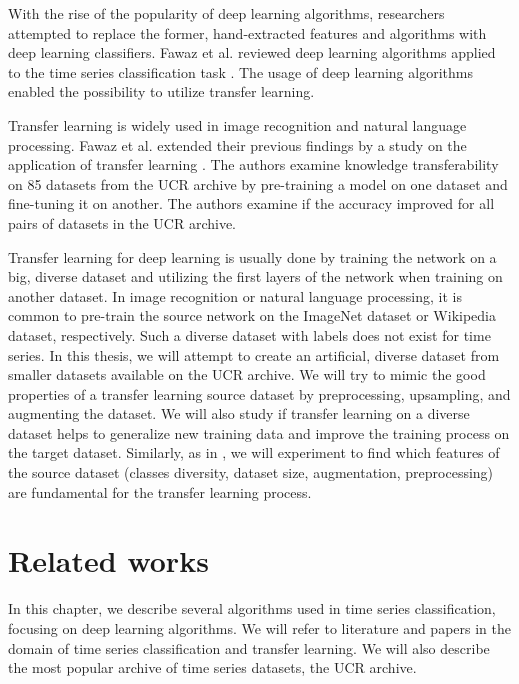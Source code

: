 \documentclass[a4paper,11pt,twoside]{report}
\theoremstyle{definition}
\begin{document}
With the rise of the popularity of deep learning algorithms, researchers attempted to replace the former, hand-extracted features and algorithms with deep learning classifiers. Fawaz et al. reviewed deep learning algorithms applied to the time series classification task \cite{dl_tsc}. The usage of deep learning algorithms enabled the possibility to utilize transfer learning.

Transfer learning is widely used in image recognition and natural language processing. Fawaz et al. extended their previous findings by a study on the application of transfer learning \cite{dl_tsc}. The authors examine knowledge transferability on 85 datasets from the UCR archive by pre-training a model on one dataset and fine-tuning it on another. The authors examine if the accuracy improved for all pairs of datasets in the UCR archive.

Transfer learning for deep learning is usually done by training the network on a big, diverse dataset and utilizing the first layers of the network when training on another dataset. In image recognition or natural language processing, it is common to pre-train the source network on the ImageNet dataset or Wikipedia dataset, respectively. Such a diverse dataset with labels does not exist for time series. In this thesis, we will attempt to create an artificial, diverse dataset from smaller datasets available on the UCR archive. We will try to mimic the good properties of a transfer learning source dataset by preprocessing, upsampling, and augmenting the dataset. We will also study if transfer learning on a diverse dataset helps to generalize new training data and improve the training process on the target dataset. Similarly, as in \cite{imagnet}, we will experiment to find which features of the source dataset (classes diversity, dataset size, augmentation, preprocessing) are fundamental for the transfer learning process.
\chapter{Related works}
In this chapter, we describe several algorithms used in time series classification, focusing on deep learning algorithms. We will refer to literature and papers in the domain of time series classification and transfer learning. We will also describe the most popular archive of time series datasets, the UCR archive.
\end{document}
